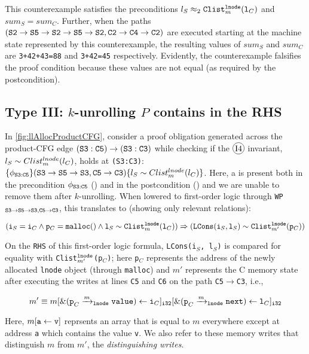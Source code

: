 This counterexample satisfies the preconditions $l_S\approx_2{\tt Clist}^{{\tt lnode}}_{m}({\tt l}_C)$
and $sum_S=sum_C$. Further, when the
paths $({\tt S2\rightarrow S5\rightarrow S2\rightarrow S5\rightarrow S2}, {\tt C2\rightarrow C4\rightarrow C2})$
are executed starting at the machine state represented by this counterexample, the resulting
values of $sum_S$ and $sum_C$ are {\tt 3+42+43=88} and {\tt 3+42=45} respectively. Evidently, the
counterexample falsifies the proof condition because these values are not equal (as required by the postcondition).
\vspace{-6px}
\subsection[Handling Type III Proof Obligations]{Type III: $k$-unrolling $P$ contains \recursiveRelations{} in the RHS}
\label{sec:cat3}
In \cref{fig:llAllocProductCFG}, consider a proof obligation generated
across the product-CFG edge ${\tt (S3:C5) \rightarrow (S3:C3)}$
while checking if the {\small $\circled{I4}$} invariant, $l_{S}\sim{}Clist^{lnode}_{m}(l_{C})$,
holds at {\tt (S3:C3)}:
$\{\phi_{{\tt S3:C5}}\} ({\tt S3\rightarrow S5\rightarrow S3}, {\tt C5\rightarrow C3}) \{l_{S}\sim{}Clist^{lnode}_{m}(l_{C})\}$.
Here, a \recursiveRelation{} is present both in the precondition $\phi_{{\tt S3:C5}}$ ({\small {}})
and in the postcondition ({\small {}}) and we are unable to
remove them after $k$-unrolling.
When lowered to first-order logic
through {\tt WP$_{{\tt S3\rightarrow S5\rightarrow S3},{\tt C5\rightarrow C3}}$}, this translates to (showing only relevant
relations):
\vspace{-5px}
\begin{small}
\begin{equation}\label{eqn:ex1cat3}
({\tt i}_S={\tt i}_C \land {\tt p}_C={\tt malloc()} \land {\tt l}_S \sim{} {\tt Clist}_m^{{\tt lnode}}({\tt l}_C)) \Rightarrow ({\tt LCons}({\tt i}_S, {\tt l}_S) \sim{} {\tt Clist}_{m'}^{{\tt lnode}}({\tt p}_C))
\end{equation}
\end{small}
On the {\tt RHS} of this first-order logic formula, {\tt LCons(i$_S$, l$_S$)} is compared for
equality with {\tt Clist$_{m'}^{{\tt lnode}}$(p$_C$)}; here {\tt p$_C$}
represents the address of the newly allocated {\tt lnode} object (through {\tt malloc}) and $m'$
represents the C memory state after executing the writes at lines
{\tt C5} and {\tt C6} on the path {\tt C5$\rightarrow$C3},
i.e.,
\vspace{-5px}
\begin{small}
\begin{equation}\label{eqn:memstore}
m' \equiv m[{\tt \&(p}_C\xrightarrow[]{m}_{\mathrm{\tt lnode}}{\tt value}) \leftarrow {\tt i}_C]_{\tt i32}[{\tt \&(p}_C\xrightarrow[]{m}_{\mathrm{\tt lnode}}{\tt next}) \leftarrow {\tt l}_C]_{\tt i32}
\end{equation}
\end{small}
Here, $m[{\tt a}\leftarrow{\tt v}]$ reprsents an array that is
equal to $m$ everywhere except at address {\tt a} which contains the value {\tt v}.
We also refer to
these memory writes that distinguish $m$ from $m'$, the {\em distinguishing writes}.

